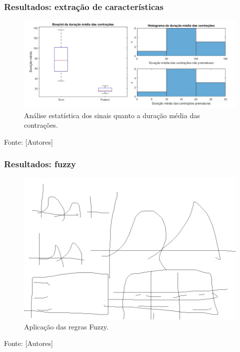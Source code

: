 \documentclass{beamer}
\begin{document}

\begin{frame}
	\frametitle{Resultados: extração de características}	
	
	\begin{figure}[H]
		\caption{\label{caract} Análise estatística dos sinais quanto a duração média das contrações.}
		\begin{center}
			\includegraphics[scale=0.45]{imagens/caract.png} 		
		\end{center}
	\end{figure}
	
	Fonte: [Autores]
	
\end{frame}


\begin{frame}
	\frametitle{Resultados: fuzzy}	
	
	\begin{figure}[H]
		\caption{\label{regrasfuz} Aplicação das regras Fuzzy.}
		\begin{center}
			\includegraphics[scale=0.35]{imagens/regrasfuz.png} 		
		\end{center}
	\end{figure}
	
	Fonte: [Autores]
	
\end{frame}
\end{document}
